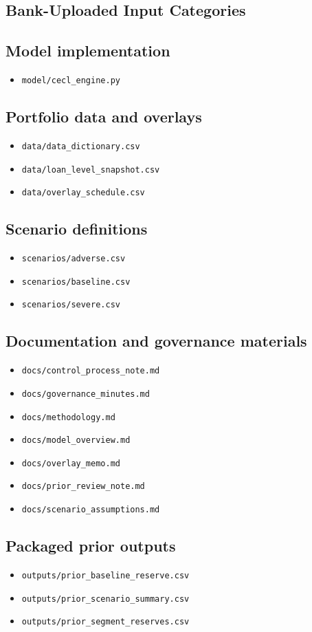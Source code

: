 \documentclass[11pt]{article}
\begin{document}
\subsection*{Bank-Uploaded Input Categories}
\subsection*{Model implementation}
\begin{itemize}
\item \texttt{model/cecl\_engine.py}
\end{itemize}
\subsection*{Portfolio data and overlays}
\begin{itemize}
\item \texttt{data/data\_dictionary.csv}
\item \texttt{data/loan\_level\_snapshot.csv}
\item \texttt{data/overlay\_schedule.csv}
\end{itemize}
\subsection*{Scenario definitions}
\begin{itemize}
\item \texttt{scenarios/adverse.csv}
\item \texttt{scenarios/baseline.csv}
\item \texttt{scenarios/severe.csv}
\end{itemize}
\subsection*{Documentation and governance materials}
\begin{itemize}
\item \texttt{docs/control\_process\_note.md}
\item \texttt{docs/governance\_minutes.md}
\item \texttt{docs/methodology.md}
\item \texttt{docs/model\_overview.md}
\item \texttt{docs/overlay\_memo.md}
\item \texttt{docs/prior\_review\_note.md}
\item \texttt{docs/scenario\_assumptions.md}
\end{itemize}
\subsection*{Packaged prior outputs}
\begin{itemize}
\item \texttt{outputs/prior\_baseline\_reserve.csv}
\item \texttt{outputs/prior\_scenario\_summary.csv}
\item \texttt{outputs/prior\_segment\_reserves.csv}
\end{itemize}
\end{document}
